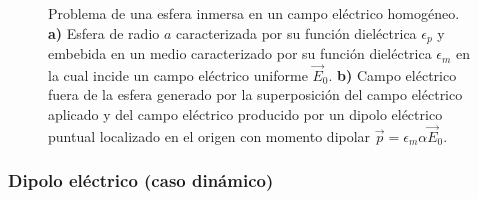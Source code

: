 \begin{figure}[H]
	\centering
	\caption{Problema de una esfera inmersa en un campo eléctrico homogéneo. \textbf{a)} Esfera de radio $a$ caracterizada por su función dieléctrica $\epsilon_p$ y embebida en un medio caracterizado por su función dieléctrica $\epsilon_m$ en la cual incide un campo eléctrico uniforme $\Vec{E}_0$. \textbf{b)} Campo eléctrico fuera de la esfera generado por la superposición del campo eléctrico aplicado y del campo eléctrico producido por un dipolo eléctrico puntual localizado en el origen con momento dipolar $\vec{p}= \epsilon_m\alpha\Vec{E}_0$.}
	\label{steady_state}
\end{figure}
 

\subsubsection{Dipolo eléctrico (caso dinámico)}

